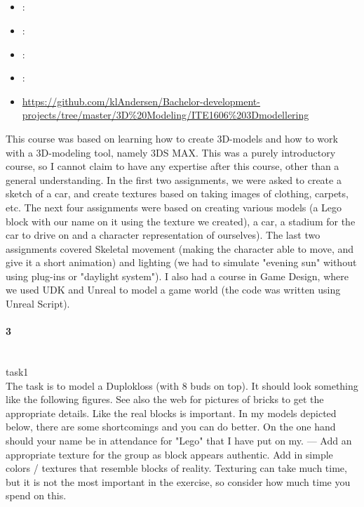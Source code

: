 \subsection[3D Modelling]{}
\label{sec:ite1606_3d_modelling}
\begin{itemize} 
	\item {}: 
	\item {}: 
	\item {}: 
	\item {}: 
	\item {} \url{https://github.com/klAndersen/Bachelor-development-projects/tree/master/3D%20Modeling/ITE1606%203Dmodellering}
\end{itemize} 
This course was based on learning how to create 3D-models and how to work with a 3D-modeling tool, namely 3DS MAX. 
This was a purely introductory course, so I cannot claim to have any expertise after this course, other than a general understanding.
\vspace{0.5em}\newline
In the first two assignments, we were asked to create a sketch of a car, and create textures based on taking images of clothing, carpets, etc. 
The next four assignments were based on creating various models (a Lego block with our name on it using the texture we created), a car, 
a stadium for the car to drive on and a character representation of ourselves).
\vspace{0.5em}\newline
The last two assignments covered Skeletal movement (making the character able to move, and give it a short animation) and lighting 
(we had to simulate "evening sun" without using plug-ins or "daylight system").
\vspace{0.5em}\newline
I also had a course in Game Design, where we used UDK and Unreal to model a game world (the code was written using Unreal Script).

\paragraph{ 3} ~\\
task1 \\
The task is to model a Duplokloss (with 8 buds on top). 
It should look something like the following figures. 
See also the web for pictures of bricks to get the appropriate details. 
Like the real blocks is important. In my models depicted below, there are some shortcomings and you can do better. 
On the one hand should your name be in attendance for "Lego" that I have put on my.
---
Add an appropriate texture for the group as block appears authentic. 
Add in simple colors / textures that resemble blocks of reality. 
Texturing can take much time, but it is not the most important in the exercise, so consider how much time you spend on this.

